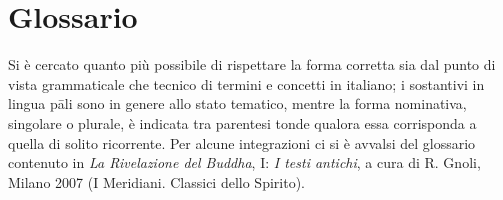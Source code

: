 \chapter{Glossario}

Si è cercato quanto più possibile di rispettare la forma corretta sia
dal punto di vista grammaticale che tecnico di termini e concetti in
italiano; i sostantivi in lingua pāli sono in genere allo stato
tematico, mentre la forma nominativa, singolare o plurale, è indicata
tra parentesi tonde qualora essa corrisponda a quella di solito
ricorrente. Per alcune integrazioni ci si è avvalsi del glossario
contenuto in \emph{La Rivelazione del Buddha}, I: \emph{I testi
antichi}, a cura di R. Gnoli, Milano 2007 (I Meridiani. Classici dello Spirito).


